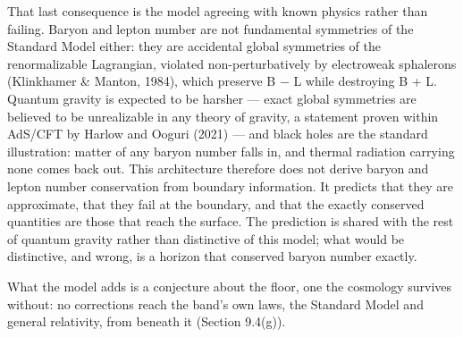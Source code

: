 \documentclass[
]{article}
\begin{document}
That last consequence is the model agreeing with known physics rather
than failing. Baryon and lepton number are not fundamental symmetries of
the Standard Model either: they are accidental global symmetries of the
renormalizable Lagrangian, violated non-perturbatively by electroweak
sphalerons (Klinkhamer \& Manton, 1984), which preserve B − L while
destroying B + L. Quantum gravity is expected to be harsher --- exact
global symmetries are believed to be unrealizable in any theory of
gravity, a statement proven within AdS/CFT by Harlow and Ooguri (2021)
--- and black holes are the standard illustration: matter of any baryon
number falls in, and thermal radiation carrying none comes back out.
This architecture therefore does not derive baryon and lepton number
conservation from boundary information. It predicts that they are
approximate, that they fail at the boundary, and that the exactly
conserved quantities are those that reach the surface. The prediction is
shared with the rest of quantum gravity rather than distinctive of this
model; what would be distinctive, and wrong, is a horizon that conserved
baryon number exactly.

What the model adds is a conjecture about the floor, one the cosmology
survives without: no corrections reach the band's own laws, the Standard
Model and general relativity, from beneath it (Section 9.4(g)).
\end{document}
